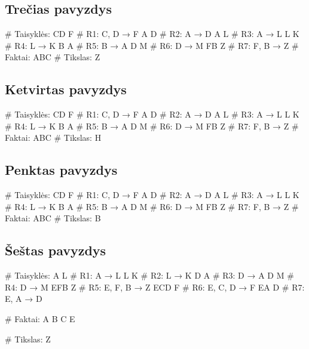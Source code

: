 \subsection{Trečias pavyzdys}

\begin{pythonaienv}[fc]
# Taisyklės:
CD F                                    # R1: C, D → F
A D                                     # R2: A → D
A L                                     # R3: A → L
L K                                     # R4: L → K
B A                                     # R5: B → A
D M                                     # R6: D → M
FB Z                                    # R7: F, B → Z
# Faktai:
ABC
# Tikslas:
Z
\end{pythonaienv}

\subsection{Ketvirtas pavyzdys}

\begin{pythonaienv}[fc]
# Taisyklės:
CD F                                    # R1: C, D → F
A D                                     # R2: A → D
A L                                     # R3: A → L
L K                                     # R4: L → K
B A                                     # R5: B → A
D M                                     # R6: D → M
FB Z                                    # R7: F, B → Z
# Faktai:
ABC
# Tikslas:
H
\end{pythonaienv}

\subsection{Penktas pavyzdys}

\begin{pythonaienv}[fc]
# Taisyklės:
CD F                                    # R1: C, D → F
A D                                     # R2: A → D
A L                                     # R3: A → L
L K                                     # R4: L → K
B A                                     # R5: B → A
D M                                     # R6: D → M
FB Z                                    # R7: F, B → Z
# Faktai:
ABC
# Tikslas:
B
\end{pythonaienv}

\subsection{Šeštas pavyzdys}

\begin{pythonaienv}[fc]

# Taisyklės:
A L                                     # R1: A → L
L K                                     # R2: L → K
D A                                     # R3: D → A
D M                                     # R4: D → M
EFB Z                                   # R5: E, F, B → Z
ECD F                                   # R6: E, C, D → F
EA D                                    # R7: E, A → D

# Faktai:
A B C E

# Tikslas:
Z

\end{pythonaienv}
